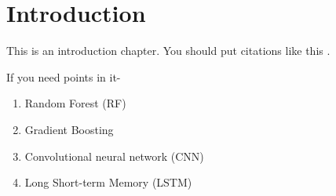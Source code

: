\chapter{Introduction}

This is an introduction chapter. You should put citations like this \citep{Zhang2011}.

If you need points in it- 

\begin{enumerate}
    \item Random Forest (RF)
    \item  Gradient Boosting
    \item Convolutional neural network (CNN)
    \item Long Short-term Memory (LSTM)

\end{enumerate}


\newpage